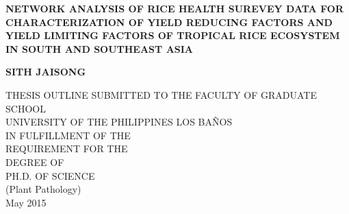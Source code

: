 \pagestyle{empty}

\begin{titlepage}
        \begin{center}
        \vspace*{0cm}

        \normalsize
        {\bf NETWORK ANALYSIS OF RICE HEALTH SUREVEY DATA FOR CHARACTERIZATION OF YIELD REDUCING FACTORS AND YIELD LIMITING FACTORS OF TROPICAL RICE ECOSYSTEM IN SOUTH AND SOUTHEAST ASIA}

        \vspace*{3.0cm}

        \normalsize
        \bf{SITH JAISONG} \\

        \vspace*{3.0cm}

        \normalsize
        THESIS OUTLINE SUBMITTED TO THE FACULTY OF GRADUATE SCHOOL\\
        UNIVERSITY OF THE PHILIPPINES LOS BA\~NOS\\ 
 IN FULFILLMENT OF THE \\
        REQUIREMENT FOR THE \\ 
        DEGREE OF \\
        \vspace*{2.0cm}
        PH.D. OF SCIENCE \\
        (Plant Pathology) \\

        \vspace*{1.0cm}
        May 2015
        \end{center}
\end{titlepage}

\pagestyle{plain}
\setcounter{page}{2}

\cleardoublepage %
 
